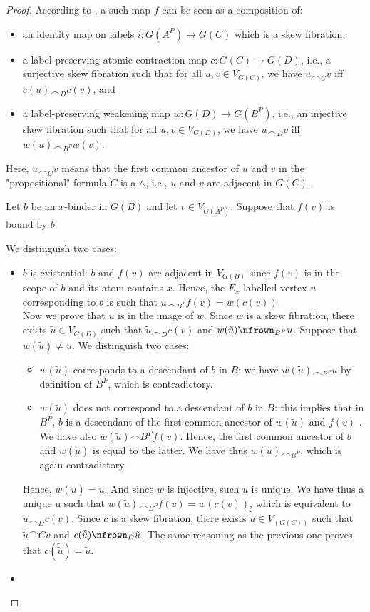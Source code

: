 \documentclass{article}
\theoremstyle{definition}
\begin{document}
\begin{proof}
According to \cite{Strassburger 2007}, a such map $f$ can be seen as a
composition of:
\begin{itemize}
  \item an identity map on labels $i: G(A^P) \rightarrow G(C)$ which is a skew fibration,
  \item a label-preserving atomic contraction map $c: G(C) \rightarrow G(D)$, i.e., a
	surjective skew fibration such that for all $u, v \in V_{G(C)}$,
	we have $u \frown_{C} v$ iff $c(u) \frown_{D} c(v)$, and
  \item a label-preserving weakening map $w: G(D) \rightarrow G(B^P)$, i.e., an
	injective skew fibration such that for all $u, v \in V_{G(D)}$, we have 
	$u \frown_{D} v$ iff $w(u) \frown_{B^P} w(v)$.

\end{itemize}
Here, $u \frown_{C} v$ means that the first common ancestor of $u$ and $v$ in
the "propositional" formula $C$ is a $\wedge$, i.e., $u$ and $v$ are adjacent in
$G(C)$. 

	Let $b$ be an $x$-binder in $G(B)$ and let $v \in V_{G(A^P)}$. Suppose that $f(v)$ is bound by $b$. 

We distinguish two cases:
\begin{itemize}
	\item $b$ is existential: $b$ and $f(v)$ are adjacent in $V_{G(B)}$ since
	$f(v)$ is in the scope of $b$ and its atom contains $x$. Hence, the
	$E_x$-labelled vertex $u$ corresponding to $b$ is such that
	$u \frown_{B^P} f(v) = w(c(v))$. \\
	Now we prove that $u$ is in the image of $w$. Since $w$ is a skew
	fibration, there exists $\tilde{u} \in V_{G(D)}$ such that
		$\tilde{u} \frown_{D} c(v)$ and $w(\tilde{u}) \nfrown_{B^P} u$.
	Suppose that $w(\tilde{u}) \neq u$.
	We distinguish two cases:
	\begin{itemize}
	  \item $w(\tilde{u})$ corresponds to a descendant of $b$ in $B$: we have $w(\tilde{u}) \frown_{B^P} u$ by definition of $B^P$, which is contradictory.
	  \item $w(\tilde{u})$ does not correspond to a descendant of $b$ in $B$: this implies that in $B^P$, $b$ is a descendant of the first common ancestor of $w(\tilde{u})$ and $f(v)$ . We have also $w(\tilde{u}) \frown {B^P} f(v)$. Hence, the first common ancestor of $b$ and $w(\tilde{u})$ is equal to the latter. We have thus $w(\tilde{u}) \frown_{B^P}$, which is again contradictory.
  \end{itemize}
  Hence, $w(\tilde{u}) = u$.
  And since $w$ is injective, such $\tilde{u}$ is unique.
  We have thus a unique u such that $w(\tilde{u}) \frown_{B^P} f(v) = w(c(v))$, which is equivalent to $\tilde{u} \frown_{D} c(v)$. Since $c$ is a skew fibration, there exists $\tilde{\tilde{u}} \in V_(G(C))$ such that $\tilde{\tilde{u}} \frown{C} v$ and 
  $c(\tilde{\tilde{u}}) \nfrown_{D} \tilde{u}$.
  The same reasoning as the previous one proves that $c(\tilde{\tilde{u}}) = \tilde{u}$.  
  \item 
\end{itemize}

\fi

\end{proof}
\end{document}

